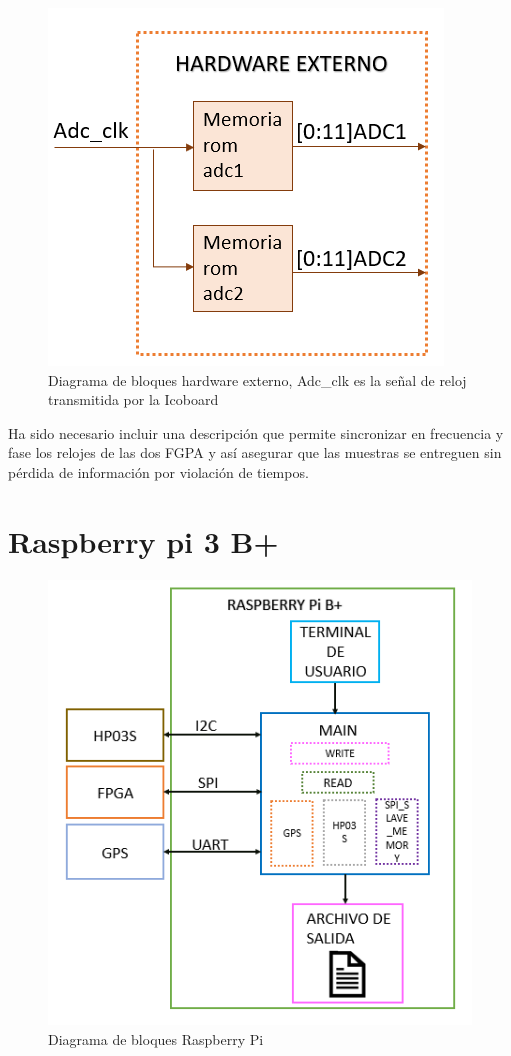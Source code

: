 \begin{figure}[h]
\includegraphics[scale=0.7]{Figs/hardexter.PNG} 
\centering
\caption[Diagrama de bloques hardware externo]{Diagrama de bloques hardware externo, Adc\_clk es la señal de reloj transmitida por la Icoboard}
\label{adecuacion}
\end{figure}
Ha sido necesario incluir una descripción  que permite sincronizar en frecuencia y fase los relojes de las dos FGPA y así asegurar que las muestras se entreguen sin pérdida de información por violación de tiempos.

\section{Raspberry pi 3 B+}

\begin{figure}[H]
\includegraphics[scale=0.8]{Figs/raspidiagrama.PNG} 
\centering
\caption{Diagrama de bloques Raspberry Pi}
\label{rasp}
\end{figure}

